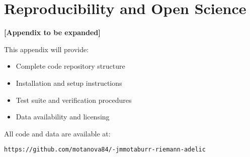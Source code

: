\section{Reproducibility and Open Science}
\label{app:reproducibility}

\textbf{[Appendix to be expanded]}

This appendix will provide:
\begin{itemize}
\item Complete code repository structure
\item Installation and setup instructions
\item Test suite and verification procedures
\item Data availability and licensing
\end{itemize}

All code and data are available at:
\begin{center}
\texttt{https://github.com/motanova84/-jmmotaburr-riemann-adelic}
\end{center}
